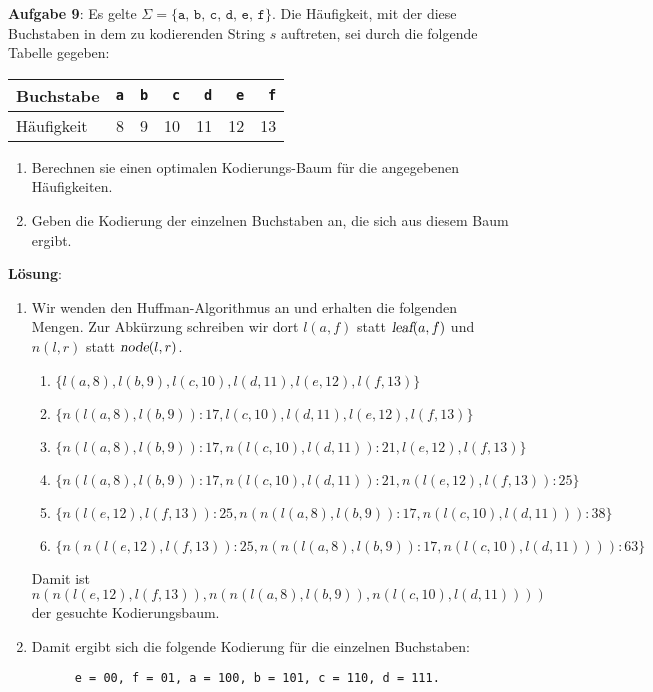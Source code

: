 \documentclass{article}
\begin{document}
\noindent
\textbf{Aufgabe 9}:
Es gelte $\Sigma = \{ \mathtt{a},\,\mathtt{b},\,\mathtt{c},\,\mathtt{d},\,\mathtt{e},\,\mathtt{f} \}$.
Die H\"aufigkeit, mit der diese Buchstaben in dem zu kodierenden String $s$ auftreten, sei durch die
folgende Tabelle gegeben:

\begin{center}
\begin{tabular}[t]{|l|r|r|r|r|r|r|}
\hline
Buchstabe  & \texttt{a} & \texttt{b} & \texttt{c} & \texttt{d} & \texttt{e} & \texttt{f} \\
\hline
H\"aufigkeit &          8 &          9 &         10 &         11 &         12 &         13 \\
\hline
\end{tabular}
\end{center}
\begin{enumerate}
\item Berechnen sie einen optimalen Kodierungs-Baum f\"ur die angegebenen H\"aufigkeiten.
\item Geben die Kodierung der einzelnen Buchstaben an, die sich aus diesem Baum ergibt.
\end{enumerate}

\noindent
\textbf{L\"osung}:
\begin{enumerate}
\item Wir wenden den Huffman-Algorithmus an und erhalten die folgenden Mengen.  Zur Abk\"urzung
      schreiben wir dort $l(a,f)$ statt $\textsl{leaf}(a,f)$ und $n(l,r)$ statt $\textsl{node}(l,r)$.
      \begin{enumerate}
      \item $\{ l(a,8), l(b,9), l(c,10), l(d,11), l(e,12), l(f,13) \}$
      \item $\{ n(l(a,8), l(b,9)):17, l(c,10), l(d,11), l(e,12), l(f,13) \}$
      \item $\{ n(l(a,8), l(b,9)):17, n(l(c,10), l(d,11)):21, l(e,12), l(f,13) \}$
      \item $\{ n(l(a,8), l(b,9)):17, n(l(c,10), l(d,11)):21, n(l(e,12), l(f,13)):25 \}$
      \item $\{ n(l(e,12), l(f,13)):25, n(n(l(a,8), l(b,9)):17, n(l(c,10), l(d,11))):38 \}$
      \item $\{ n(n(l(e,12), l(f,13)):25, n(n(l(a,8), l(b,9)):17, n(l(c,10), l(d,11)))):63 \}$
      \end{enumerate}
      Damit ist 
      \\[0.2cm]
      \hspace*{1.3cm} $n(n(l(e,12), l(f,13)), n(n(l(a,8), l(b,9)), n(l(c,10), l(d,11))))$
      \\[0.2cm]
      der gesuchte Kodierungsbaum.
\item Damit ergibt sich die folgende Kodierung f\"ur die einzelnen Buchstaben:
      \begin{verbatim}
      e = 00, f = 01, a = 100, b = 101, c = 110, d = 111.
      \end{verbatim}
\end{enumerate}
\end{document}
